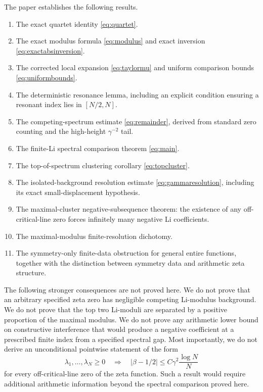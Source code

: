 \documentclass[11pt]{article}
\newcommand{\Li}{\lambda}
\begin{document}
The paper establishes the following results.

\begin{enumerate}[label=\arabic*.]
\item The exact quartet identity \eqref{eq:quartet}.
\item The exact modulus formula \eqref{eq:modulus} and exact inversion \eqref{eq:exactabsinversion}.
\item The corrected local expansion \eqref{eq:taylormu} and uniform comparison bounds \eqref{eq:uniformbounds}.
\item The deterministic resonance lemma, including an explicit condition ensuring a resonant index lies in \([N/2,N]\).
\item The competing-spectrum estimate \eqref{eq:remainder}, derived from standard zero counting and the high-height \(\gamma^{-2}\) tail.
\item The finite-Li spectral comparison theorem \eqref{eq:main}.
\item The top-of-spectrum clustering corollary \eqref{eq:topcluster}.
\item The isolated-background resolution estimate \eqref{eq:gammaresolution}, including its exact small-displacement hypothesis.
\item The maximal-cluster negative-subsequence theorem: the existence of any off-critical-line zero forces infinitely many negative Li coefficients.
\item The maximal-modulus finite-resolution dichotomy.
\item The symmetry-only finite-data obstruction for general entire functions, together with the distinction between symmetry data and arithmetic zeta structure.
\end{enumerate}

The following stronger consequences are not proved here. We do not prove that an arbitrary specified zeta zero has negligible competing Li-modulus background. We do not prove that the top two Li-moduli are separated by a positive proportion of the maximal modulus. We do not prove any arithmetic lower bound on constructive interference that would produce a negative coefficient at a prescribed finite index from a specified spectral gap. Most importantly, we do not derive an unconditional pointwise statement of the form
\[
\Li_1,\ldots,\Li_N\ge0
\quad\Longrightarrow\quad
|\beta-1/2|\le C\gamma^2\frac{\log N}{N}
\]
for every off-critical-line zero of the zeta function. Such a result would require additional arithmetic information beyond the spectral comparison proved here.
\end{document}
